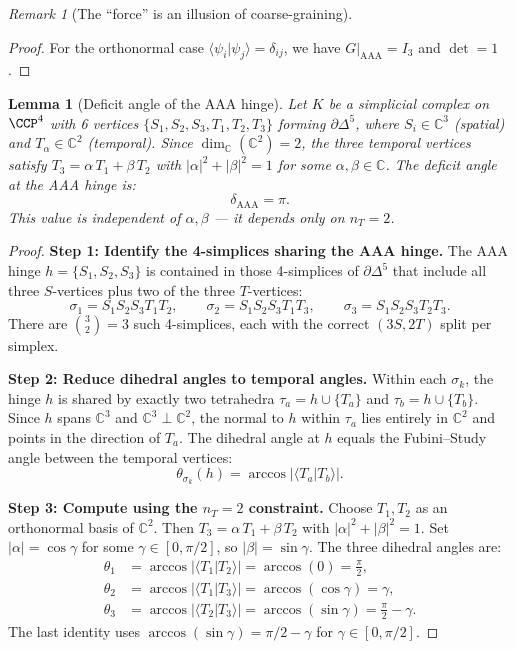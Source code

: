 \documentclass[12pt]{article}
\newtheorem{lemma}[theorem]{Lemma}
\theoremstyle{remark}
\newtheorem{remark}[theorem]{Remark}
\theoremstyle{definition}
\newcommand{\CC}{\mathbb{C}}
\begin{document}
\begin{remark}[The ``force'' is an illusion of coarse-graining]
\begin{proof}
For the orthonormal case $\langle \psi_i | \psi_j \rangle = \delta_{ij}$,
we have $G|_{\mathrm{AAA}} = I_3$ and $\det = 1$.
\end{proof}

\begin{lemma}[Deficit angle of the AAA hinge]
\label{lem:delta}
Let $K$ be a simplicial complex on $\CCP^4$ with 6 vertices
$\{S_1, S_2, S_3, T_1, T_2, T_3\}$ forming $\partial\Delta^5$, where
$S_i \in \CC^3$ (spatial) and $T_\alpha \in \CC^2$ (temporal).
Since $\dim_{\CC}(\CC^2) = 2$, the three temporal vertices
satisfy $T_3 = \alpha\, T_1 + \beta\, T_2$ with
$|\alpha|^2 + |\beta|^2 = 1$ for some $\alpha, \beta \in \CC$.
The deficit angle at the AAA hinge is:
\begin{equation}
\boxed{\delta_{\mathrm{AAA}} = \pi.}
\end{equation}
This value is independent of $\alpha, \beta$ --- it depends only on $n_T = 2$.
\end{lemma}

\begin{proof}
\textbf{Step 1: Identify the 4-simplices sharing the AAA hinge.}
The AAA hinge $h = \{S_1, S_2, S_3\}$ is contained in those 4-simplices
of $\partial\Delta^5$ that include all three $S$-vertices plus two of
the three $T$-vertices:
\begin{equation}
\sigma_1 = S_1 S_2 S_3 T_1 T_2, \qquad
\sigma_2 = S_1 S_2 S_3 T_1 T_3, \qquad
\sigma_3 = S_1 S_2 S_3 T_2 T_3.
\end{equation}
There are $\binom{3}{2} = 3$ such 4-simplices, each with the correct
$(3S, 2T)$ split per simplex.

\medskip\noindent
\textbf{Step 2: Reduce dihedral angles to temporal angles.}
Within each $\sigma_k$, the hinge $h$ is shared by exactly two
tetrahedra $\tau_a = h \cup \{T_a\}$ and $\tau_b = h \cup \{T_b\}$.
Since $h$ spans $\CC^3$ and $\CC^3 \perp \CC^2$,
the normal to $h$ within $\tau_a$ lies entirely in $\CC^2$
and points in the direction of $T_a$.  The dihedral angle at $h$
equals the Fubini--Study angle between the temporal vertices:
\begin{equation}
\theta_{\sigma_k}(h) = \arccos\bigl|\langle T_a | T_b \rangle\bigr|.
\end{equation}

\medskip\noindent
\textbf{Step 3: Compute using the $n_T = 2$ constraint.}
Choose $T_1, T_2$ as an orthonormal basis of $\CC^2$.
Then $T_3 = \alpha\, T_1 + \beta\, T_2$ with
$|\alpha|^2 + |\beta|^2 = 1$.
Set $|\alpha| = \cos\gamma$ for some $\gamma \in [0, \pi/2]$,
so $|\beta| = \sin\gamma$. The three dihedral angles are:
\begin{align}
\theta_1 &= \arccos|\langle T_1 | T_2 \rangle|
         = \arccos(0) = \frac{\pi}{2}, \\
\theta_2 &= \arccos|\langle T_1 | T_3 \rangle|
         = \arccos(\cos\gamma) = \gamma, \\
\theta_3 &= \arccos|\langle T_2 | T_3 \rangle|
         = \arccos(\sin\gamma) = \frac{\pi}{2} - \gamma.
\end{align}
The last identity uses $\arccos(\sin\gamma) = \pi/2 - \gamma$
for $\gamma \in [0, \pi/2]$.


\end{proof}
\end{remark}
\end{document}
